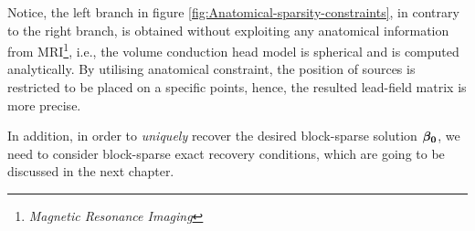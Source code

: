 Notice, the left branch in figure \ref{fig:Anatomical-sparsity-constraints}, in contrary to the right branch, is obtained without exploiting any anatomical information from MRI\footnote{{\emph{Magnetic Resonance Imaging}}}, i.e., the volume conduction head model is spherical and is computed analytically. 
By utilising anatomical constraint, the position of sources is restricted to be placed on a specific points, hence, the resulted lead-field matrix is more precise.

In addition, in order to \emph{uniquely} recover the desired block-sparse solution $\boldsymbol{\beta}_{\boldsymbol{0}}$, we need to consider block-sparse exact recovery conditions, which are going to be discussed in the next chapter.
\newpage

